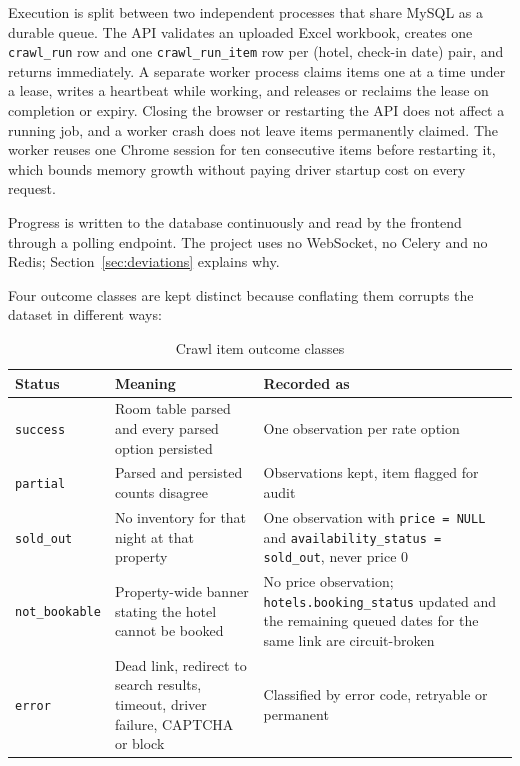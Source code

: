 Execution is split between two independent processes that share MySQL as a durable queue. The API validates an uploaded Excel workbook, creates one \texttt{crawl\_run} row and one \texttt{crawl\_run\_item} row per (hotel, check-in date) pair, and returns immediately. A separate worker process claims items one at a time under a lease, writes a heartbeat while working, and releases or reclaims the lease on completion or expiry. Closing the browser or restarting the API does not affect a running job, and a worker crash does not leave items permanently claimed. The worker reuses one Chrome session for ten consecutive items before restarting it, which bounds memory growth without paying driver startup cost on every request.

Progress is written to the database continuously and read by the frontend through a polling endpoint. The project uses no WebSocket, no Celery and no Redis; Section~\ref{sec:deviations} explains why.

Four outcome classes are kept distinct because conflating them corrupts the dataset in different ways:

\begin{table}[!htbp]
\centering
\caption{Crawl item outcome classes}
\label{tab:outcomes}
\begin{tabular}{|p{2.6cm}|p{5.2cm}|p{5.4cm}|}
\hline
\textbf{Status} & \textbf{Meaning} & \textbf{Recorded as} \\
\hline
\texttt{success} & Room table parsed and every parsed option persisted & One observation per rate option \\
\hline
\texttt{partial} & Parsed and persisted counts disagree & Observations kept, item flagged for audit \\
\hline
\texttt{sold\_out} & No inventory for that night at that property & One observation with \texttt{price = NULL} and \texttt{availability\_status = sold\_out}, never price 0 \\
\hline
\texttt{not\_bookable} & Property-wide banner stating the hotel cannot be booked & No price observation; \texttt{hotels.booking\_status} updated and the remaining queued dates for the same link are circuit-broken \\
\hline
\texttt{error} & Dead link, redirect to search results, timeout, driver failure, CAPTCHA or block & Classified by error code, retryable or permanent \\
\hline
\end{tabular}
\end{table}

